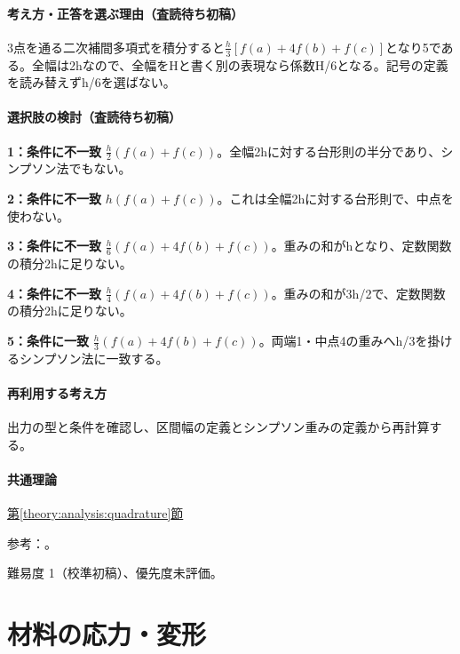 \paragraph{考え方・正答を選ぶ理由（査読待ち初稿）} 3点を通る二次補間多項式を積分すると\(\frac h3[f(a)+4f(b)+f(c)]\)となり5である。全幅は2hなので、全幅をHと書く別の表現なら係数H/6となる。記号の定義を読み替えずh/6を選ばない。

\paragraph{選択肢の検討（査読待ち初稿）}\mbox{}\par

\noindent\textbf{1：条件に不一致} \(\frac h2(f(a)+f(c))\)。全幅2hに対する台形則の半分であり、シンプソン法でもない。\par

\noindent\textbf{2：条件に不一致} \(h(f(a)+f(c))\)。これは全幅2hに対する台形則で、中点を使わない。\par

\noindent\textbf{3：条件に不一致} \(\frac h6(f(a)+4f(b)+f(c))\)。重みの和がhとなり、定数関数の積分2hに足りない。\par

\noindent\textbf{4：条件に不一致} \(\frac h4(f(a)+4f(b)+f(c))\)。重みの和が3h/2で、定数関数の積分2hに足りない。\par

\noindent\textbf{5：条件に一致} \(\frac h3(f(a)+4f(b)+f(c))\)。両端1・中点4の重みへh/3を掛けるシンプソン法に一致する。\par

\paragraph{再利用する考え方} 出力の型と条件を確認し、区間幅の定義とシンプソン重みの定義から再計算する。

\paragraph{共通理論} \hyperref[theory:analysis:quadrature]{第\ref*{theory:analysis:quadrature}節}

\par 参考：\cite{nist_quadrature}。

\par 難易度 1（校準初稿）、優先度未評価。

\section{材料の応力・変形}

